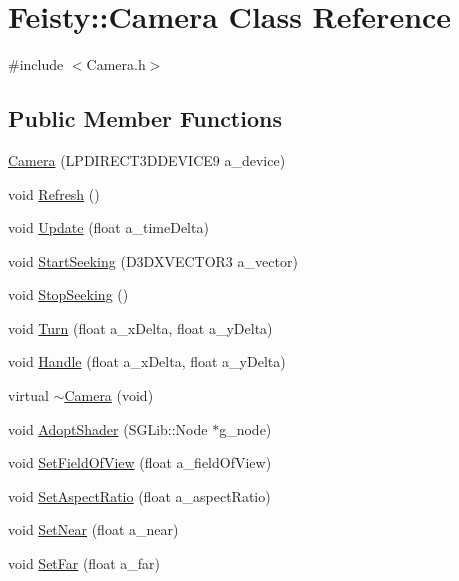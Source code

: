 \hypertarget{class_feisty_1_1_camera}{
\section{Feisty::Camera Class Reference}
\label{class_feisty_1_1_camera}
}


{\ttfamily \#include $<$Camera.h$>$}\subsection*{Public Member Functions}
\begin{DoxyCompactItemize}
\item 
\hyperlink{class_feisty_1_1_camera_a7480bd2212144072df9186aba48a93e4}{Camera} (LPDIRECT3DDEVICE9 a\_\-device)
\item 
void \hyperlink{class_feisty_1_1_camera_a8729327b8c34fe72d8c6e4964c0d4a6b}{Refresh} ()
\item 
void \hyperlink{class_feisty_1_1_camera_ae633d0619f978c5104f2c8d5dbf10aa5}{Update} (float a\_\-timeDelta)
\item 
void \hyperlink{class_feisty_1_1_camera_a9144982d770e3134fb1b52c82da4669d}{StartSeeking} (D3DXVECTOR3 a\_\-vector)
\item 
void \hyperlink{class_feisty_1_1_camera_ab579f233a45c7a2b629d240c36cdbb61}{StopSeeking} ()
\item 
void \hyperlink{class_feisty_1_1_camera_aea1e6fbd53ad47e302f3fa38535cb3cd}{Turn} (float a\_\-xDelta, float a\_\-yDelta)
\item 
void \hyperlink{class_feisty_1_1_camera_a4a05e648973a0cb47c02b09449b4ae13}{Handle} (float a\_\-xDelta, float a\_\-yDelta)
\item 
virtual \hyperlink{class_feisty_1_1_camera_a8dd5a9f236d04875100a7404ada01edc}{$\sim$Camera} (void)
\item 
void \hyperlink{class_feisty_1_1_camera_a8eb2963d22386fad3a2beba4e3d1871e}{AdoptShader} (SGLib::Node $\ast$g\_\-node)
\item 
void \hyperlink{class_feisty_1_1_camera_aac9f58b9b0f63ce1f354cfef473d08e9}{SetFieldOfView} (float a\_\-fieldOfView)
\item 
void \hyperlink{class_feisty_1_1_camera_a38dcec7dc8214ebb274c71e2dcc2eeb3}{SetAspectRatio} (float a\_\-aspectRatio)
\item 
void \hyperlink{class_feisty_1_1_camera_a58228535280e133cc8a40dc20eed6454}{SetNear} (float a\_\-near)
\item 
void \hyperlink{class_feisty_1_1_camera_ad70999c56c819dcef588e7e93280ebce}{SetFar} (float a\_\-far)

\end{DoxyCompactItemize}
